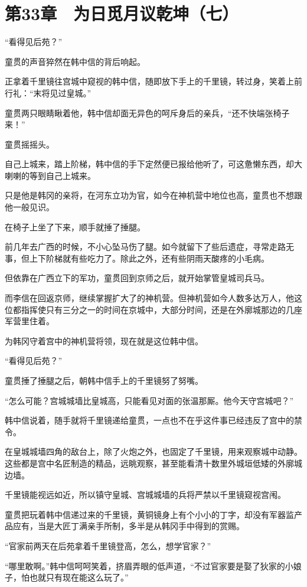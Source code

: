 \section{第33章　为日觅月议乾坤（七）}

“看得见后苑？”

童贯的声音猝然在韩中信的背后响起。

正拿着千里镜往宫城中窥视的韩中信，随即放下手上的千里镜，转过身，笑着上前行礼：“末将见过皇城。”

童贯两只眼睛瞅着他，韩中信却面无异色的呵斥身后的亲兵，“还不快端张椅子来！”

童贯摇摇头。

自己上城来，踏上阶梯，韩中信的手下定然便已报给他听了，可这惫懒东西，却大喇喇的等到自己上城来。

只是他是韩冈的亲将，在河东立功为官，如今在神机营中地位也高，童贯也不想跟他一般见识。

在椅子上坐了下来，顺手就捶了捶腿。

前几年去广西的时候，不小心坠马伤了腿。如今就留下了些后遗症，寻常走路无事，但上下阶梯就有些吃力了。除此之外，还有些阴雨天酸疼的小毛病。

但依靠在广西立下的军功，童贯回到京师之后，就开始掌管皇城司兵马。

而李信在回返京师，继续掌握扩大了的神机营。但神机营如今人数多达万人，他这位都指挥使只有三分之一的时间在京城中，大部分时间，还是在外廓城那边的几座军营里住着。

为韩冈守着宫中的神机营将领，现在就是这位韩中信。

“看得见后苑？”

童贯捶了捶腿之后，朝韩中信手上的千里镜努了努嘴。

“怎么可能？宫城城墙比皇城高，只能看见对面的张温那厮。他今天守宫城吧？”

韩中信说着，随手就将千里镜递给童贯，一点也不在乎这件事已经违反了宫中的禁令。

在皇城城墙四角的敌台上，除了火炮之外，也固定了千里镜，用来观察城中动静。这些都是宫中名匠制造的精品，远眺观察，甚至能看清十数里外城垣低矮的外廓城边墙。

千里镜能视远如近，所以镇守皇城、宫城城墙的兵将严禁以千里镜窥视宫闱。

童贯把玩着韩中信递过来的千里镜，黄铜镜身上有个小小的丁字，却没有军器监产品应有，当是大匠丁满亲手所制，多半是从韩冈手中得到的赏赐。

“官家前两天在后苑拿着千里镜登高，怎么，想学官家？”

“哪里敢啊。”韩中信呵呵笑着，挤眉弄眼的低声道，“不过官家要是娶了狄家的小娘子，怕也就只有现在能这么玩了。”

